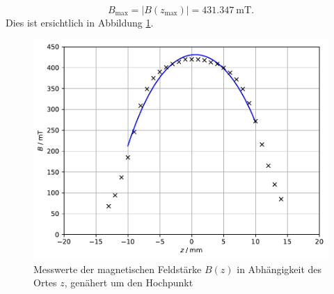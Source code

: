 \documentclass[
  bibliography=totoc,     %
  captions=tableheading,  %
  titlepage=firstiscover, %
]{scrartcl}
\begin{document}
\begin{equation*}
    B_\text{max} = |B(z_\text{max})| = \SI{431.347}{\milli\tesla}.
\end{equation*}
Dies ist ersichtlich in Abbildung \ref{fig:feldmessung2}.
\begin{figure}[H]
    \centering
    \includegraphics[scale=0.8]{build/feldmessung2.pdf}
    \caption{Messwerte der magnetischen Feldstärke $B(z)$ in Abhängigkeit des Ortes $z$, genähert um den Hochpunkt}
    \label{fig:feldmessung2}
\end{figure}
\end{document}
